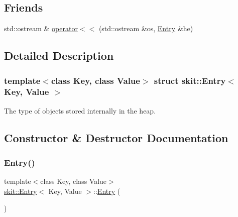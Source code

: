 \subsection*{Friends}
\begin{DoxyCompactItemize}
\item 
std\+::ostream \& \hyperlink{structskit_1_1Entry_a885f1645de32df3dbfbf9f2f47f7ea1f}{operator$<$$<$} (std\+::ostream \&os, \hyperlink{structskit_1_1Entry}{Entry} \&he)
\end{DoxyCompactItemize}


\subsection{Detailed Description}
\subsubsection*{template$<$class Key, class Value$>$\newline
struct skit\+::\+Entry$<$ Key, Value $>$}

The type of objects stored internally in the heap. 

\subsection{Constructor \& Destructor Documentation}
\mbox{\label{structskit_1_1Entry_a7712b738e8f1417b9d4553f533eceaa6}} 
\subsubsection{\texorpdfstring{Entry()}{Entry()}\hspace{0.1cm}{\footnotesize\ttfamily [1/2]}}
{\footnotesize\ttfamily template$<$class Key, class Value$>$ \\
\hyperlink{structskit_1_1Entry}{skit\+::\+Entry}$<$ Key, Value $>$\+::\hyperlink{structskit_1_1Entry}{Entry} (\begin{DoxyParamCaption}{ }\end{DoxyParamCaption})\hspace{0.3cm}{\ttfamily [default]}}

\mbox{\label{structskit_1_1Entry_ac18e178625a0a7e3ea5dc06a740c4e8d}} 

